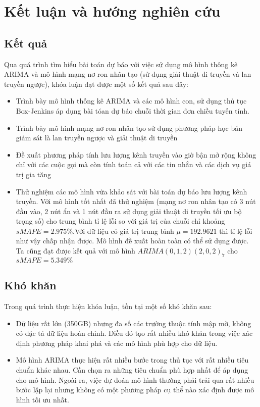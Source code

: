 \chapter{Kết luận và hướng nghiên cứu}
\ifpdf
    \graphicspath{{4_conclusion/figures/PNG/}{4_conclusion/figures/PDF/}{4_conclusion/figures/}}
\else
    \graphicspath{{4_conclusion/figures/EPS/}{4_conclusion/figures/}}
\fi

\section{Kết quả}
Qua quá trình tìm hiểu bài toán dự báo với việc sử dụng mô hình thông kê ARIMA và mô hình mạng nơ ron nhân tạo (sử dụng giải thuật di truyền và lan truyền ngược), khóa luận đạt được một số kết quả sau đây:
\begin{itemize}
\item Trình bày mô hình thống kê ARIMA và các mô hình con, sử dụng thủ tục Box-Jenkins áp dụng bài tóan dự báo chuỗi thời gian đơn chiều tuyến tính.
\item Trình bày mô hình mạng nơ ron nhân tạo sử dụng phương pháp học bán giám sát là lan truyền ngược và giải thuật di truyền
\item Đề xuất phương pháp tính lưu lượng kênh truyền vào giờ bận mở rộng không chỉ với các cuộc gọi mà còn tính toán cả với các tin nhắn và các dịch vụ giá trị gia tăng
\item Thử nghiệm các mô hình vừa khảo sát với bài toán dự báo lưu lượng kênh truyền. Với mô hình tốt nhất đã thử nghiệm (mạng nơ ron nhân tạo có 3 nút đầu vào, 2 nút ẩn và 1 nút đầu ra sử dụng giải thuật di truyền tối ưu bộ trọng số) cho trung bình tỉ lệ lỗi so với giá trị của chuỗi chỉ khoảng $sMAPE=2.975\%$.Với dữ liệu có giá trị trung bình $\mu = 192.9621$ thì tỉ lệ lỗi như vậy chấp nhận được. Mô hình đề xuất hoàn toàn có thể sử dụng được. Ta cũng đạt được kết quả với mô hình $ARIMA(0,1,2)(2,0,2)_7$  cho $sMAPE = 5.349\%$
\end{itemize}

\section{Khó khăn}
Trong quá trình thực hiện khóa luận, tồn tại một số khó khăn sau:
\begin{itemize}
\item Dữ liệu rất lớn (350GB) nhưng đa số các trường thuộc tính mập mờ, không có đặc tả dữ liệu hoàn chỉnh. Điều đó tạo rất nhiều khó khăn trong việc xác định phương pháp khai phá và các mô hình phù hợp cho dữ liệu.
\item Mô hình ARIMA thực hiện rất nhiều bước trong thủ tục với rất nhiều tiêu chuẩn khác nhau. Cần chọn ra những tiêu chuẩn phù hợp nhất để áp dụng cho mô hình. Ngoài ra, việc dự đoán mô hình thường phải trải qua rất nhiều bước lặp lại nhưng không có một phương pháp cụ thể nào xác định được mô hình tối ưu nhất. 
\end{itemize}


